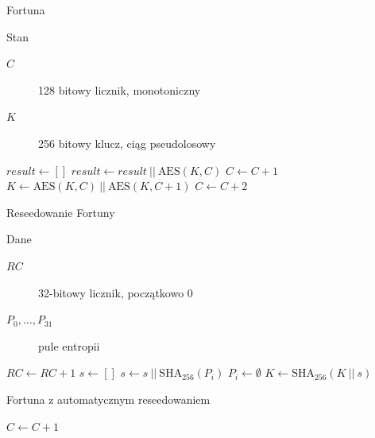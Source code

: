 \documentclass{mp}
\begin{document}
\begin{frame}{Fortuna}
\begin{block}{Stan}
\begin{description}
\item[$C$] 128 bitowy licznik, monotoniczny
\item[$K$] 256 bitowy klucz, ciąg pseudolosowy
\end{description}
\end{block}
\begin{algorithm}[H]
\pause
{}
{
$result \leftarrow []$ \;
{
$result\leftarrow result\ ||\ \text{AES}(K, C)$ \;
$C\leftarrow C+1$ \;
}
$K\leftarrow \text{AES}(K, C)\ ||\ \text{AES}(K, C+1)$ \;
$C\leftarrow C+2$ \;
 \;
}
\end{algorithm}
\end{frame}
\begin{frame}{Reseedowanie Fortuny}
\begin{block}{Dane}
\begin{description}
\item[$RC$] 32-bitowy licznik, początkowo $0$
\item[$P_0, \ldots, P_{31}$] pule entropii
\end{description}
\end{block}
\begin{algorithm}[H]
\Fn{\FortunaReseed{}}
{
$RC \leftarrow RC + 1$ \;
$s \leftarrow []$ \;
{
{
$s \leftarrow s\ ||\ \text{SHA}_{256}(P_i)$ \;
$P_i\leftarrow \emptyset$ \;
}
}
$K \leftarrow \text{SHA}_{256}(K\ ||\ s)$ \;
}
\end{algorithm}
\end{frame}
\begin{frame}{Fortuna z automatycznym reseedowaniem}
\begin{algorithm}[H]
{
{
\FortunaReseed{} \;
$C\leftarrow C+1$ \;
}
}
\end{algorithm}
\end{frame}
\end{document}

